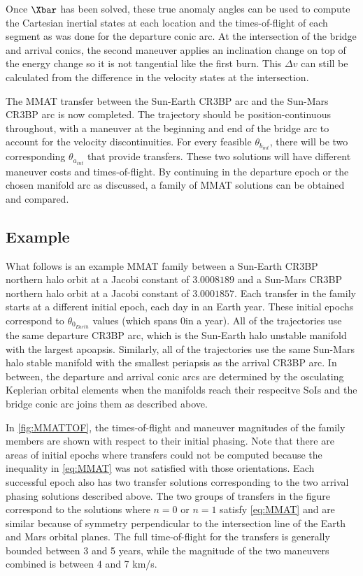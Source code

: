 Once $\Xbar$ has been solved, these true anomaly angles can be used to compute the Cartesian
inertial states at each location and the times-of-flight of each segment as was done for the
departure conic arc. At the intersection of the bridge and arrival conics, the second maneuver
applies an inclination change on top of the energy change so it is not tangential like the first
burn. This $\Delta v$ can still be calculated from the difference in the velocity states at the
intersection.

The MMAT transfer between the Sun-Earth CR3BP arc and the Sun-Mars CR3BP arc is now completed. The
trajectory should be position-continuous throughout, with a maneuver at the beginning and end of
the bridge arc to account for the velocity discontinuities. For every feasible $\theta_{b_{int}}$,
there will be two corresponding $\theta_{a_{int}}$ that provide transfers. These two solutions will
have different maneuver costs and times-of-flight. By continuing in the departure epoch or the
chosen manifold arc as discussed, a family of MMAT solutions can be obtained and compared.

\subsection{Example}
What follows is an example MMAT family between a Sun-Earth CR3BP northern halo orbit at a Jacobi
constant of $3.0008189$ and a Sun-Mars CR3BP northern halo orbit at a Jacobi constant of
$3.0001857$. Each transfer in the family starts at a different initial epoch, each day in an Earth
year. These initial epochs correspond to $\theta_{0_{Earth}}$ values (which spans
0\textdegree in a year). All of the trajectories use the same departure CR3BP arc,
which is the Sun-Earth halo unstable manifold with the largest apoapsis. Similarly, all of the
trajectories use the same Sun-Mars halo stable manifold with the smallest periapsis as the arrival
CR3BP arc. In between, the departure and arrival conic arcs are determined by the osculating
Keplerian orbital elements when the manifolds reach their respecitve SoIs and the bridge conic arc
joins them as described above.

In \cref{fig:MMATTOF}, the times-of-flight and maneuver magnitudes of the family members are shown
with respect to their initial phasing. Note that there are areas of initial epochs where transfers
could not be computed because the inequality in \cref{eq:MMAT} was not satisfied with those
orientations. Each successful epoch also has two transfer solutions corresponding to the two
arrival phasing solutions described above. The two groups of transfers in the figure correspond to 
the solutions where $n=0$ or $n=1$ satisfy \cref{eq:MMAT} and are similar because of symmetry
perpendicular to the intersection line of the Earth and Mars orbital planes. The full
time-of-flight for the transfers is generally bounded between 3 and 5 years, while the magnitude of
the two maneuvers combined is between 4 and 7 km/s.

